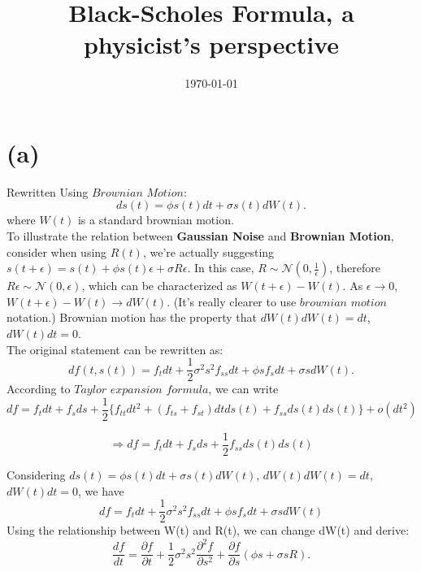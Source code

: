 \documentclass[12pt,a4paper]{paper}
\title{Black-Scholes Formula, a physicist's perspective}
\author{}
\date{\today}
\begin{document}
\maketitle

\section{(a)}
Rewritten Using $Brownian$ $Motion$: 
\begin{equation}
ds(t) = \phi s(t) dt + \sigma s(t) dW(t).
\end{equation}
where $W(t)$ is a standard brownian motion.\\\indent To illustrate the relation between \textbf{Gaussian Noise} and \textbf{Brownian Motion}, consider when using $R(t)$, we're actually suggesting $s(t + \epsilon) = s(t) + \phi s(t) \epsilon + \sigma R \epsilon$. In this case, $R \sim \mathcal{N}(0, \frac{1}{\epsilon})$, therefore $R \epsilon \sim \mathcal{N}(0, \epsilon)$, which can be characterized as $W(t + \epsilon) - W(t)$. As $\epsilon \rightarrow 0$, $W(t + \epsilon) - W(t) \rightarrow dW(t)$. (It's really clearer to use $brownian$ $motion$ notation.) Brownian motion has the property that $dW(t)dW(t) = dt$, $dW(t) dt = 0$.\\
\indent The original statement can be rewritten as: 
\begin{equation}
df(t, s(t)) = f_t dt + \frac{1}{2}\sigma^2s^2f_{ss}dt + \phi s f_s dt + \sigma s dW(t).
\end{equation}
\indent According to $Taylor$ $expansion$ $formula$, we can write
\begin{equation} 
df = f_t dt + f_s ds + \frac{1}{2}\{f_{tt} dt^2 + (f_{ts} + f_{st})dt ds(t) + f_{ss} ds(t)ds(t) \} + o(dt^2)
\end{equation} 

\begin{equation}
\Longrightarrow df = f_t dt + f_s ds + \frac{1}{2} f_{ss} ds(t)ds(t)
\end{equation}

\indent Considering $ds(t) = \phi s(t) dt + \sigma s(t) dW(t)$, $dW(t)dW(t) = dt$, $dW(t) dt = 0$, we have 
\begin{equation}
df = f_t dt + \frac{1}{2}\sigma^2s^2f_{ss}dt + \phi s f_s dt + \sigma s dW(t)
\end{equation}
\indent Using the relationship between W(t) and R(t), we can change dW(t) and derive:
\begin{equation}
\frac{df}{dt}=\frac{\partial f}{\partial t}+\frac{1}{2}\sigma ^{2}s^{2}\frac{\partial^2 f}{\partial s^2}+\frac{\partial f}{\partial s}(\phi s+\sigma sR).
\end{equation}
\end{document}
